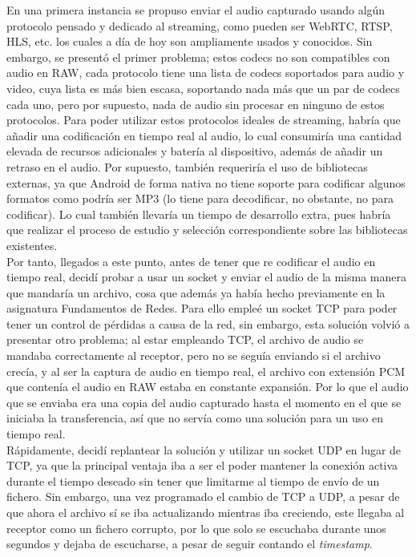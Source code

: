 En una primera instancia se propuso enviar el audio capturado usando algún
protocolo pensado y dedicado al streaming, como pueden ser WebRTC, RTSP, HLS,
etc. los cuales a día de hoy son ampliamente usados y conocidos. Sin embargo, se
presentó el primer problema; estos codecs no son compatibles con audio en RAW,
cada protocolo tiene una lista de codecs soportados para audio y video, cuya
lista es más bien escasa, soportando nada más que un par de codecs cada uno,
pero por supuesto, nada de audio sin procesar en ninguno de estos protocolos.
Para poder utilizar estos protocolos ideales de streaming, habría que añadir una
codificación en tiempo real al audio, lo cual consumiría una cantidad elevada de
recursos adicionales y batería al dispositivo, además de añadir un retraso en el
audio. Por supuesto, también requeriría el uso de bibliotecas externas, ya que
Android de forma nativa no tiene soporte para codificar algunos formatos como
podría ser MP3 (lo tiene para decodificar, no obstante, no para codificar). Lo cual
también llevaría un tiempo de desarrollo extra, pues habría que realizar el
proceso de estudio y selección correspondiente sobre las bibliotecas existentes.\\

Por tanto, llegados a este punto, antes de tener que re codificar el audio en
tiempo real, decidí probar a usar un socket y enviar el audio de la misma manera
que mandaría un archivo, cosa que además ya había hecho previamente en la
asignatura Fundamentos de Redes. Para ello empleé un socket TCP para poder tener
un control de pérdidas a causa de la red, sin embargo, esta solución volvió a
presentar otro problema; al estar empleando TCP, el archivo de audio se mandaba
correctamente al receptor, pero no se seguía enviando si el archivo crecía, y al
ser la captura de audio en tiempo real, el archivo con extensión PCM que
contenía el audio en RAW estaba en constante expansión. Por lo que el audio que
se enviaba era una copia del audio capturado hasta el momento en el que se
iniciaba la transferencia, así que no servía como una solución para un uso en
tiempo real.\\

Rápidamente, decidí replantear la solución y utilizar un socket UDP en lugar de
TCP, ya que la principal ventaja iba a ser el poder mantener la conexión activa
durante el tiempo deseado sin tener que limitarme al tiempo de envío de un
fichero. Sin embargo, una vez programado el cambio de TCP a UDP, a pesar de que
ahora el archivo sí se iba actualizando mientras iba creciendo, este llegaba al
receptor como un fichero corrupto, por lo que solo se escuchaba durante unos
segundos y dejaba de escucharse, a pesar de seguir contando el \emph{timestamp}.\\


